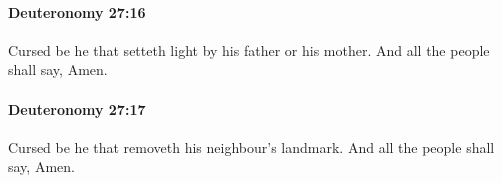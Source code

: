 		\paragraph{Deuteronomy 27:16} %
			\label{DEUTERONOMY-27-16}

			Cursed be he that setteth light by his father or his mother. And all the people shall say, Amen.


		\paragraph{Deuteronomy 27:17} %
			\label{DEUTERONOMY-27-17}

			Cursed be he that removeth his neighbour's landmark. And all the people shall say, Amen.


